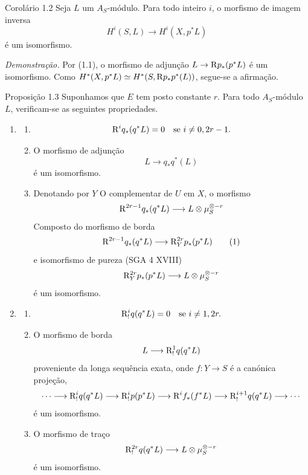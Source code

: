 \begin{statement}{Corolário 1.2}
Seja $L$ um $A_S$-módulo. Para todo inteiro $i$, o morfismo de imagem inversa
\[
H^i(S,L)\longrightarrow H^i(X,p^*L)
\]
é um isomorfismo.
\end{statement}

\emph{Demonstração.} Por (1.1), o morfismo de adjunção $L\to \mathrm{R} p_*(p^*L)$ é um isomorfismo. Como $H^*(X,p^*L)\simeq H^*(S,\mathrm{R} p_*p^*(L))$, segue-se a afirmação.

\begin{statement}{Proposição 1.3}
Suponhamos que $E$ tem posto constante $r$. Para todo $A_S$-módulo $L$, verificam-se as seguintes propriedades.
\begin{enumerate}[label=(\roman*)]
\item
\begin{enumerate}[label=\alph*)]
\item
\[
\mathrm{R}^i q_*(q^*L)=0\quad\text{se }i\ne 0,2r-1.
\]
\item O morfismo de adjunção
\[
L\longrightarrow q_*q^*(L)
\]
é um isomorfismo.
\item Denotando por $Y$ O complementar de $U$ em $X$, o morfismo
\[
\mathrm{R}^{2r-1}q_*(q^*L)\longrightarrow L\otimes\mu_S^{\otimes -r}
\]
Composto do morfismo de borda
\[
\mathrm{R}^{2r-1}q_*(q^*L)\longrightarrow \mathrm{R}_Y^{2r}p_*(p^*L)
\tag{1}
\]
e isomorfismo de pureza (SGA 4 XVIII)
\[
\mathrm{R}_Y^{2r}p_*(p^*L)\longrightarrow L\otimes\mu_S^{\otimes -r}
\]
é um isomorfismo.
\end{enumerate}
\item
\begin{enumerate}[label=\alph*)]
\item
\[
\mathrm{R}_!^i q(q^*L)=0\quad\text{se }i\ne 1,2r.
\]
\item O morfismo de borda
\[
L\longrightarrow \mathrm{R}_!^1 q(q^*L)
\]
proveniente da longa sequência exata, onde $f:Y\to S$ é a canónica projeção,
\[
\cdots\longrightarrow \mathrm{R}_!^i q(q^*L)\longrightarrow \mathrm{R}_!^i p(p^*L)
\longrightarrow \mathrm{R}^i f_*(f^*L)\longrightarrow \mathrm{R}_!^{i+1}q(q^*L)\longrightarrow\cdots
\]
é um isomorfismo.
\item O morfismo de traço
\[
\mathrm{R}_!^{2r}q(q^*L)\longrightarrow L\otimes\mu_S^{\otimes -r}
\]
é um isomorfismo.
\end{enumerate}
\end{enumerate}
\end{statement}
